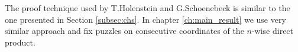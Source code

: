 The proof technique used by T.Holenstein and G.Schoenebeck is similar to the one presented in Section \ref{subsec:chs}.
In chapter \ref{ch:main_result} we use very similar approach and fix puzzles on consecutive coordinates of the $n$-wise direct product.






